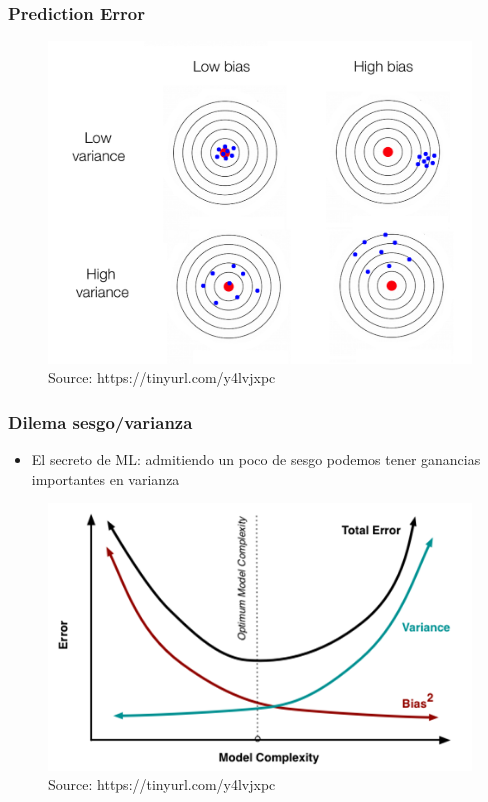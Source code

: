 \documentclass[
  shownotes,
  xcolor={svgnames},
  hyperref={colorlinks,citecolor=DarkBlue,linkcolor=DarkRed,urlcolor=DarkBlue}
  , aspectratio=169]{beamer}
\begin{document}
\begin{frame}
\frametitle{Prediction Error}

\begin{figure}[H] \centering
  \centering
  \includegraphics[scale=0.15]{figures/medium_bias_variance}
  \\
  \tiny
  Source: https://tinyurl.com/y4lvjxpc
\end{figure}


\end{frame}

\begin{frame}[fragile]
\frametitle{Dilema sesgo/varianza}

\begin{itemize}
  \item El secreto de ML: admitiendo un poco de sesgo podemos tener ganancias importantes en varianza

\end{itemize}

\pause
\begin{figure}[H] \centering
  \centering
  \includegraphics[scale=0.50]{figures/medium_bias_variance_trade_off.png}
  \\
  \tiny
  Source: https://tinyurl.com/y4lvjxpc
\end{figure}



\end{frame}
\end{document}
